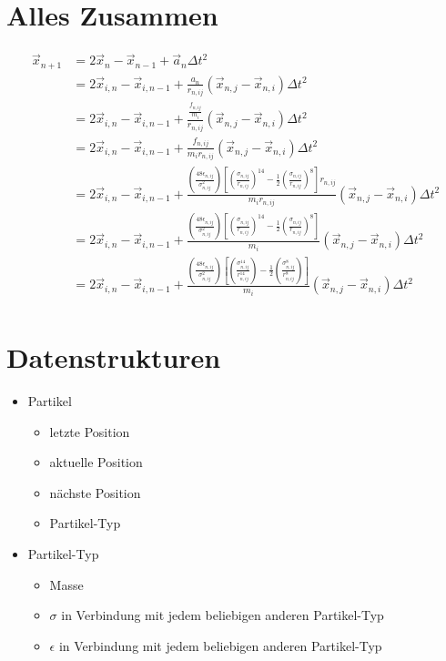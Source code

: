 \documentclass{article}
\begin{document}
\section*{Alles Zusammen}
\begin{align}
	\vec{x}_{n+1}&=2\vec{x}_n-\vec{x}_{n-1}+\vec{a}_n\Delta t^2\\
	&=2\vec{x}_{i,n}-\vec{x}_{i,n-1}+\frac{a_n}{r_{n,ij}}\left(\vec{x}_{n,j}-\vec{x}_{n,i}\right)\Delta t^2\\
	&=2\vec{x}_{i,n}-\vec{x}_{i,n-1}+\frac{\frac{f_{n,ij}}{m_i}}{r_{n,ij}}\left(\vec{x}_{n,j}-\vec{x}_{n,i}\right)\Delta t^2\\
	&=2\vec{x}_{i,n}-\vec{x}_{i,n-1}+\frac{f_{n,ij}}{m_ir_{n,ij}}\left(\vec{x}_{n,j}-\vec{x}_{n,i}\right)\Delta t^2\\
	&=2\vec{x}_{i,n}-\vec{x}_{i,n-1}+\frac{\left(\frac{48\epsilon_{n,ij}}{\sigma_{n,ij}^2}\right)\left[\left(\frac{\sigma_{n,ij}}{r_{n,ij}}\right)^{14}-\frac{1}{2}\left(\frac{\sigma_{n,ij}}{r_{n,ij}}\right)^8\right]r_{n,ij}}{m_ir_{n,ij}}\left(\vec{x}_{n,j}-\vec{x}_{n,i}\right)\Delta t^2\\
	&=2\vec{x}_{i,n}-\vec{x}_{i,n-1}+\frac{\left(\frac{48\epsilon_{n,ij}}{\sigma_{n,ij}^2}\right)\left[\left(\frac{\sigma_{n,ij}}{r_{n,ij}}\right)^{14}-\frac{1}{2}\left(\frac{\sigma_{n,ij}}{r_{n,ij}}\right)^8\right]}{m_i}\left(\vec{x}_{n,j}-\vec{x}_{n,i}\right)\Delta t^2\\
	&=2\vec{x}_{i,n}-\vec{x}_{i,n-1}+\frac{\left(\frac{48\epsilon_{n,ij}}{\sigma_{n,ij}^2}\right)\left[\left(\frac{\sigma_{n,ij}^{14}}{r_{n,ij}^{14}}\right)-\frac{1}{2}\left(\frac{\sigma_{n,ij}^8}{r_{n,ij}^8}\right)\right]}{m_i}\left(\vec{x}_{n,j}-\vec{x}_{n,i}\right)\Delta t^2\\
\end{align}


\section*{Datenstrukturen}
\begin{itemize}
	\item Partikel
	\begin{itemize}
		\item letzte     Position
		\item aktuelle Position
		\item nächste Position
		\item Partikel-Typ
	\end{itemize}
	\item Partikel-Typ
	\begin{itemize}
		\item Masse
		\item $\sigma$ in Verbindung mit jedem beliebigen anderen Partikel-Typ
		\item $\epsilon$ in Verbindung mit jedem beliebigen anderen Partikel-Typ
	\end{itemize}
\end{itemize}
\end{document}
